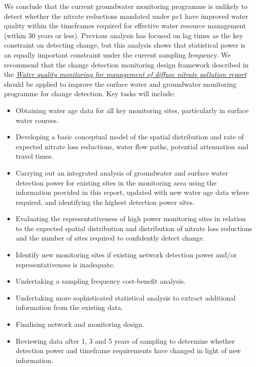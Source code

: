 We conclude that the current groundwater monitoring programme is unlikely to detect whether the nitrate reductions mandated under \gls{pc1} have improved water quality within the timeframes required for effective water resource management (within 30 years or less).
Previous analysis has focused on lag times as the key constraint on detecting change, but this analysis shows that statistical power is an equally important constraint under the current sampling frequency.
We recommend that the change detection monitoring design framework described in the \textit{\href{https://github.com/Komanawa-Solutions-Ltd/gw_detect_power/blob/main/supporting_documents/Water_quality_monitoring_for_management_of_diffuse_nitrate_pollution_Final.pdf}{Water quality monitoring for management of diffuse nitrate pollution report}} \citep{olw_guidance}
should be applied to improve the surface water and groundwater monitoring programme for change detection. Key tasks will include:
\begin{itemize}
    \item Obtaining water age data for all key monitoring sites, particularly in surface water courses.
    \item Developing a basic conceptual model of the spatial distribution and rate of expected nitrate loss reductions, water flow paths, potential attenuation and travel times.
    \item Carrying out an integrated analysis of groundwater and surface water detection power for existing sites in the monitoring area using the information provided in this report, updated with new water age data where required, and identifying the highest detection power sites.
    \item Evaluating the representativeness of high power monitoring sites in relation to the expected spatial distribution and distribution of nitrate loss reductions and the number of sites required to confidently detect change.
    \item Identify new monitoring sites if existing network detection power and/or representativeness is inadequate.
    \item Undertaking a sampling frequency cost-benefit analysis.
    \item Undertaking more sophisticated statistical analysis to extract additional information from the existing data.
    \item Finalising network and monitoring design.
    \item Reviewing data after 1, 3 and 5 years of sampling to determine whether detection power and timeframe requirements have changed in light of new information.
\end{itemize}

